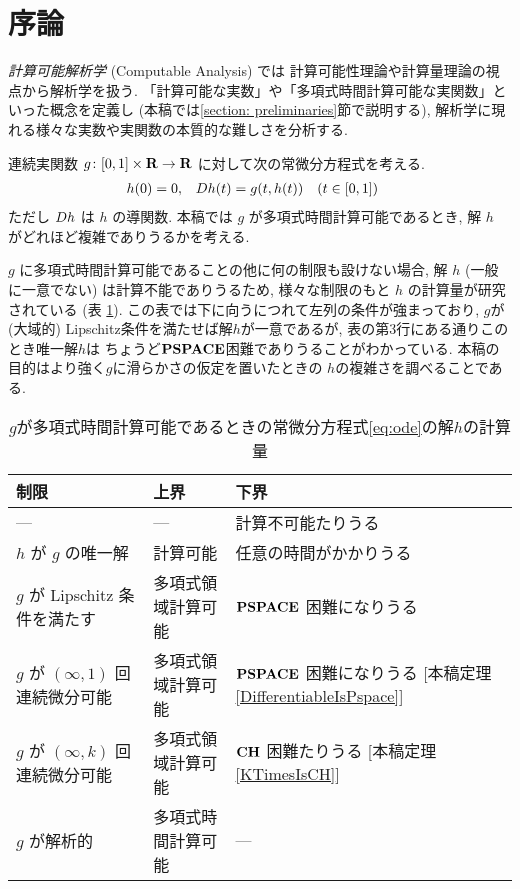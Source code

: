 \section{序論}

\emph{計算可能解析学} (Computable Analysis) \cite{weihrauch00:_comput_analy} では
計算可能性理論や計算量理論の視点から解析学を扱う. 
「計算可能な実数」や「多項式時間計算可能な実関数」といった概念を定義し
(本稿では\ref{section: preliminaries}節で説明する), 
解析学に現れる様々な実数や実関数の本質的な難しさを分析する. 

連続実関数 $g \colon [0,1] \times \mathbf R \to \mathbf R$ に対して次の常微分方程式を考える. 
\begin{align}
 \label{eq:ode}
 h(0) & = 0, &
 D h(t) & = g(t,h(t)) \quad (t \in [0,1])
\end{align}
ただし $D h$ は $h$ の導関数.
本稿では $g$ が多項式時間計算可能であるとき, 
解 $h$ がどれほど複雑でありうるかを考える.

$g$ に多項式時間計算可能であることの他に何の制限も設けない場合, 
解 $h$ (一般に一意でない) は計算不能でありうるため,
様々な制限のもと $h$ の計算量が研究されている (表 \ref{table:related}).
この表では下に向うにつれて左列の条件が強まっており, 
$g$が(大域的) Lipschitz条件を満たせば解$h$が一意であるが, 
表の第3行にある通りこのとき唯一解$h$は
ちょうど$\mathbf{PSPACE}$困難でありうることがわかっている\cite{kawamura2010lipschitz}. 
本稿の目的はより強く$g$に滑らかさの仮定を置いたときの
$h$の複雑さを調べることである. 

\begin{table}
\renewcommand\arraystretch{1.3}
\begin{center}
 \caption{$g$が多項式時間計算可能であるときの常微分方程式\eqref{eq:ode}の解$h$の計算量}
 \label{table:related}
 \begin{tabular}{lll}
  制限 & 上界 & 下界 \\
  \hline
   --- & --- & 計算不可能たりうる \cite{pour1979computable} \\
  $h$ が $g$ の唯一解 & 計算可能 \cite{coddington1955theory}
  & 任意の時間がかかりうる \cite{ko1983computational, miller1970recursive} \\
  $g$ が Lipschitz 条件を満たす & 多項式領域計算可能 \cite{ko1983computational}
      &	$\mathbf{PSPACE}$ 困難になりうる \cite{kawamura2010lipschitz}\\
  $g$ が $(\infty, 1)$ 回連続微分可能 & 多項式領域計算可能 & \parbox[t]{14zw}{$\mathbf{PSPACE}$ 困難になりうる\\{}[本稿定理\ref{DifferentiableIsPspace}]} \\
  $g$ が $(\infty, k)$ 回連続微分可能 & 多項式領域計算可能 & \parbox[t]{14zw}{$\mathbf{CH}$ 困難たりうる\\{}[本稿定理\ref{KTimesIsCH}]} \\
  $g$ が解析的 
  & 多項式時間計算可能 \cite{muller1987uniform, ko1988computing, kawamura2010complexity} 
  & ---
 \end{tabular}
\end{center}
\end{table}

